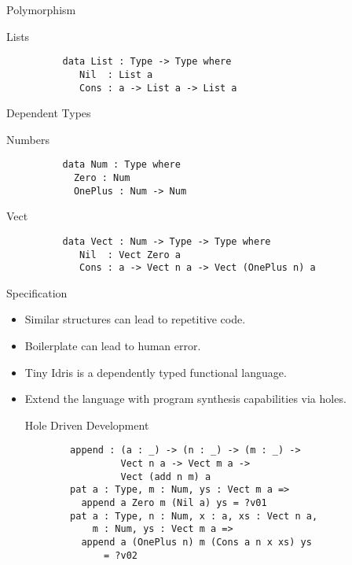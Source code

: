 \documentclass[presentation]{beamer}
\begin{document}
\begin{frame}[fragile]{Polymorphism}
      \begin{block}{Lists}
        \begin{verbatim}
          data List : Type -> Type where
             Nil  : List a
             Cons : a -> List a -> List a
        \end{verbatim}
      \end{block}
\end{frame}

\begin{frame}[fragile]{Dependent Types}
      \begin{block}{Numbers}
        \begin{verbatim}
          data Num : Type where
            Zero : Num
            OnePlus : Num -> Num 
        \end{verbatim}
      \end{block}
      \begin{block}{Vect}
        \begin{verbatim}
          data Vect : Num -> Type -> Type where
             Nil  : Vect Zero a
             Cons : a -> Vect n a -> Vect (OnePlus n) a
        \end{verbatim}
      \end{block}
\end{frame}

\begin{frame}[fragile]{Specification}
  \begin{itemize}
  \item Similar structures can lead to repetitive code.
  \item Boilerplate can lead to human error.
  \item Tiny Idris is a dependently typed functional language.
  \item Extend the language with program synthesis capabilities via holes. 
    \begin{block}{Hole Driven Development}
      \begin{verbatim}
        append : (a : _) -> (n : _) -> (m : _) ->
                 Vect n a -> Vect m a ->
                 Vect (add n m) a
        pat a : Type, m : Num, ys : Vect m a =>
          append a Zero m (Nil a) ys = ?v01
        pat a : Type, n : Num, x : a, xs : Vect n a,
            m : Num, ys : Vect m a =>
          append a (OnePlus n) m (Cons a n x xs) ys
              = ?v02
      \end{verbatim}
    \end{block}
  \end{itemize}
\end{frame}
\end{document}
